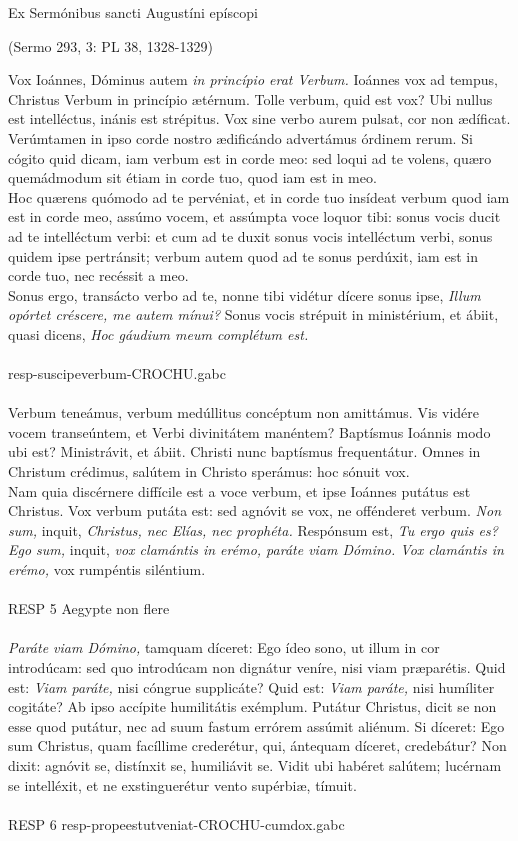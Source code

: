 \documentclass[options]{article}
\begin{document}
	Ex Sermónibus sancti Augustíni epíscopi
	\begin{flushright}
		(Sermo 293, 3: PL 38, 1328-1329)	
	\end{flushright}
	Vox Ioánnes, Dóminus autem \emph{in princípio erat Verbum.} Ioánnes vox ad tempus, Christus Verbum in princípio ætérnum. Tolle verbum, quid est vox? Ubi nullus est intelléctus, inánis est strépitus. Vox sine verbo aurem pulsat, cor non ædíficat.\\
	Verúmtamen in ipso corde nostro ædificándo advertámus órdinem rerum. Si cógito quid dicam, iam verbum est in corde meo: sed loqui ad te volens, quæro quemádmodum sit étiam in corde tuo, quod iam est in meo.\\
	Hoc quærens quómodo ad te pervéniat, et in corde tuo insídeat verbum quod iam est in corde meo, assúmo vocem, et assúmpta voce loquor tibi: sonus vocis ducit ad te intelléctum verbi: et cum ad te duxit sonus vocis intelléctum verbi, sonus quidem ipse pertránsit; verbum autem quod ad te sonus perdúxit, iam est in corde tuo, nec recéssit a meo.\\
	Sonus ergo, transácto verbo ad te, nonne tibi vidétur dícere sonus ipse, \emph{Illum opórtet créscere, me autem mínui?} Sonus vocis strépuit in ministérium, et ábiit, quasi dicens, \emph{Hoc gáudium meum complétum est.}\\
	\\
	resp-suscipeverbum-CROCHU.gabc\\
	\\
	Verbum teneámus, verbum medúllitus concéptum non amittámus.
	Vis vidére vocem transeúntem, et Verbi divinitátem manéntem? Baptísmus Ioánnis modo ubi est? Ministrávit, et ábiit. Christi nunc baptísmus frequentátur. Omnes in Christum crédimus, salútem in Christo sperámus: hoc sónuit vox.\\
	Nam quia discérnere diffícile est a voce verbum, et ipse Ioánnes putátus est Christus. Vox verbum putáta est: sed agnóvit se vox, ne offénderet verbum. \emph{Non sum,} inquit, \emph{Christus, nec Elías, nec prophéta.}  Respónsum est, \emph{Tu ergo quis es? Ego sum,} inquit, \emph{vox clamántis in erémo, paráte viam Dómino. Vox clamántis in erémo,} vox rumpéntis siléntium. \\
	\\
	RESP 5 Aegypte non flere\\
	\\
	\emph{Paráte viam Dómino,} tamquam díceret: Ego ídeo sono, ut illum in cor introdúcam: sed quo introdúcam non dignátur veníre, nisi viam præparétis.
	Quid est: \emph{Viam paráte,} nisi cóngrue supplicáte? Quid est: \emph{Viam paráte,} nisi humíliter cogitáte? Ab ipso accípite humilitátis exémplum. Putátur Christus, dicit se non esse quod putátur, nec ad suum fastum errórem assúmit aliénum.
	Si díceret: Ego sum Christus, quam facíllime crederétur, qui, ántequam díceret, credebátur? Non dixit: agnóvit se, distínxit se, humiliávit se.
	Vidit ubi habéret salútem; lucérnam se intelléxit, et ne exstinguerétur vento supérbiæ, tímuit.\\
	\\
	RESP 6  resp-propeestutveniat-CROCHU-cumdox.gabc
	
\end{document}
